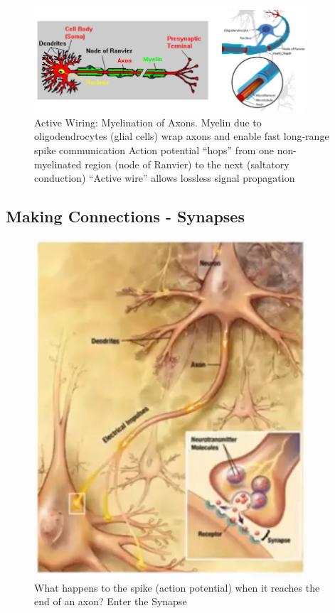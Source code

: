 \documentclass[]{article}
\begin{document}
\begin{figure}[H]
	\caption[Active Wiring: Myelination of Axons]{Active Wiring: Myelination of Axons. Myelin due to oligodendrocytes (glial cells) wrap axons and
		enable fast long-range spike communication
		Action potential “hops” from one non-myelinated region
		(node of Ranvier) to the next (saltatory conduction)
		“Active wire” allows lossless signal propagation}
	\includegraphics[width=0.9\textwidth]{myelination}
\end{figure}



\subsection{Making Connections - Synapses}
\begin{figure}[H]
	\caption[Enter the Synapse]{What happens to the spike 	(action potential) when	it reaches the 	end of an axon?	Enter the Synapse}
	\includegraphics[width=0.9\textwidth]{enter-synapse}
\end{figure}
\end{document}
